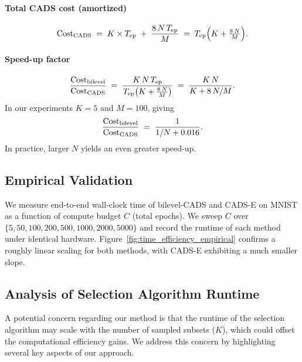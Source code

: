 \paragraph{Total CADS cost (amortized)}  
\[
\mathrm{Cost}_{\rm CADS}
\;=\;
K\times T_{\mathrm{ep}}
\;+\;
\frac{8\,N\,T_{\mathrm{ep}}}{M}
\;=\;
T_{\mathrm{ep}}\Bigl(K + \tfrac{8\,N}{M}\Bigr).
\]

\paragraph{Speed-up factor}  
\[
\frac{\mathrm{Cost}_{\rm bilevel}}{\mathrm{Cost}_{\rm CADS}}
\;=\;
\frac{K\,N\,T_{\mathrm{ep}}}{T_{\mathrm{ep}}\bigl(K + \tfrac{8\,N}{M}\bigr)}
\;=\;
\frac{K\,N}{K + 8\,N/M}.
\]
In our experiments \(K = 5\) and \(M = 100\), giving
\[
\frac{\mathrm{Cost}_{\rm bilevel}}{\mathrm{Cost}_{\rm CADS}}
\;=\;
\frac{1}{1/N + 0.016}.
\]
In practice, larger $N$ yields an even greater speed-up.

\subsection{Empirical Validation}  

We measure end-to-end wall-clock time of bilevel-CADS and CADS-E on MNIST as a function of compute budget $C$ (total epochs).  We sweep $C$ over $\{5,50,100,200,500,1000,2000,5000\}$ and record the runtime of each method under identical hardware. Figure~\ref{fig:time_efficiency_empirical} confirms a roughly linear scaling for both methods, with CADS-E exhibiting a much smaller slope.


\subsection{Analysis of Selection Algorithm Runtime}
\label{appendix:runtime_analysis}

A potential concern regarding our method is that the runtime of the selection algorithm may scale with the number of sampled subsets (\(K\)), which could offset the computational efficiency gains. We address this concern by highlighting several key aspects of our approach.

